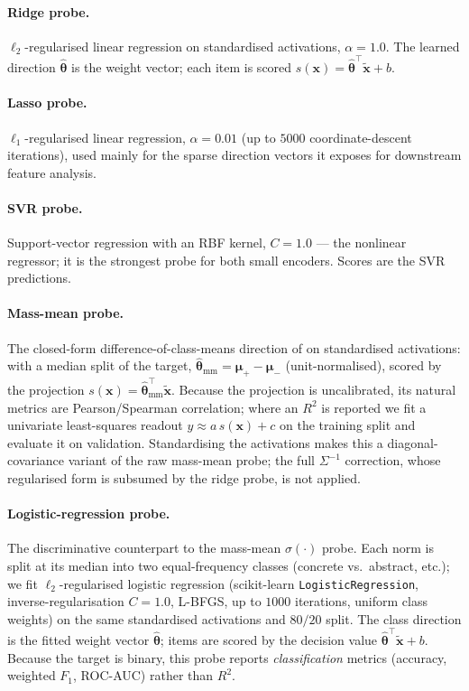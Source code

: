 \paragraph{Ridge probe.}
$\ell_2$-regularised linear regression on standardised activations,
$\alpha=1.0$. The learned direction $\hat{\bm{\theta}}$ is the weight vector;
each item is scored $s(\bm{x}) = \hat{\bm{\theta}}^{\top}\tilde{\bm{x}} + b$.

\paragraph{Lasso probe.}
$\ell_1$-regularised linear regression, $\alpha=0.01$ (up to $5000$
coordinate-descent iterations), used mainly for the sparse direction vectors it
exposes for downstream feature analysis.

\paragraph{SVR probe.}
Support-vector regression with an RBF kernel, $C=1.0$ — the nonlinear regressor;
it is the strongest probe for both small encoders. Scores are the SVR
predictions.

\paragraph{Mass-mean probe.}
The closed-form difference-of-class-means direction of \citet{marks2023geometry}
on standardised activations: with a median split of the target,
$\hat{\bm{\theta}}_{\mathrm{mm}} = \bm{\mu}_{+}-\bm{\mu}_{-}$ (unit-normalised),
scored by the projection $s(\bm{x}) = \hat{\bm{\theta}}_{\mathrm{mm}}^{\top}
\tilde{\bm{x}}$. Because the projection is uncalibrated, its natural metrics are
Pearson/Spearman correlation; where an $R^2$ is reported we fit a univariate
least-squares readout $y \approx a\,s(\bm{x}) + c$ on the training split and
evaluate it on validation. Standardising the activations makes this a
diagonal-covariance variant of the raw mass-mean probe; the full $\Sigma^{-1}$
correction, whose regularised form is subsumed by the ridge probe, is not
applied.

\paragraph{Logistic-regression probe.}
The discriminative counterpart to the mass-mean $\sigma(\cdot)$ probe. Each norm
is split at its median into two equal-frequency classes (concrete vs.\ abstract,
etc.); we fit $\ell_2$-regularised logistic regression (scikit-learn
\texttt{LogisticRegression}, inverse-regularisation $C=1.0$, L-BFGS, up to
$1000$ iterations, uniform class weights) on the same standardised activations
and $80/20$ split. The class direction is the fitted weight vector
$\hat{\bm{\theta}}$; items are scored by the decision value
$\hat{\bm{\theta}}^{\top}\tilde{\bm{x}} + b$. Because the target is binary, this
probe reports \emph{classification} metrics (accuracy, weighted $F_1$, ROC-AUC)
rather than $R^2$.

